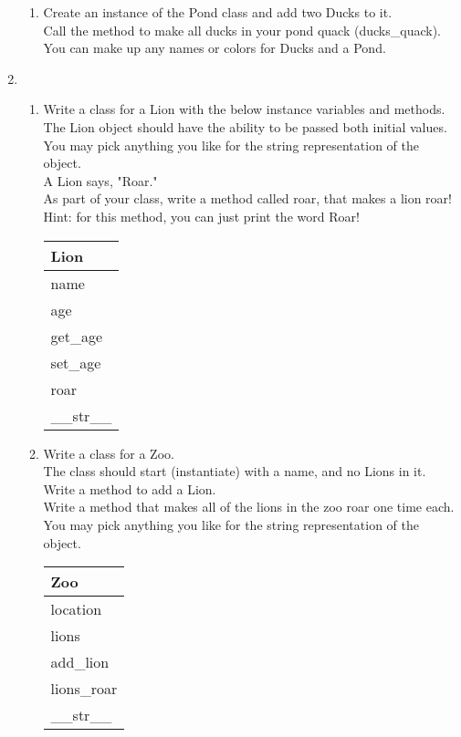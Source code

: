 \documentclass{article}
\begin{document}
\begin{enumerate}
\begin{enumerate}
		\item
			Create an instance of the Pond class and add two Ducks to it.\\
			Call the method to make all ducks in your pond quack (ducks\_quack).\\
			You can make up any names or colors for Ducks and a Pond.\\
	\end{enumerate}
\pagebreak



	\item
	\begin{enumerate}
		\item
			Write a class for a Lion with the below instance variables and methods.\\ 
			The Lion object should have the ability to be passed both initial values.\\  
			You may pick anything you like for the string representation of the object.\\
			A Lion says, "Roar."\\  
			As part of your class, write a method called roar, that makes a lion roar!\\
			Hint: for this method, you can just print the word Roar!
			\begin{flushright}
			\begin{tabular}{|l|}
				\hline
				Lion\\ \hline
				name\\	age\\	 \hline
				get\_age \\ set\_age \\ roar \\ \_\_str\_\_ \\ \hline
			\end{tabular}
			\end{flushright}

		\item
			Write a class for a Zoo. \\
			The class should start (instantiate) with a name, and no Lions in it. \\ 
			Write a method to add a Lion.\\
			Write a method that makes all of the lions in the zoo roar one time each.\\
			You may pick anything you like for the string representation of the object.
	
			\begin{flushright}
			\begin{tabular}{|l|}
				\hline
				Zoo\\ \hline  	%
				location\\ lions\\ \hline		%
				add\_lion\\ lions\_roar \\ \_\_str\_\_ \\ \hline		%
			\end{tabular}
			\end{flushright}


\end{enumerate}
\end{enumerate}
\end{document}

